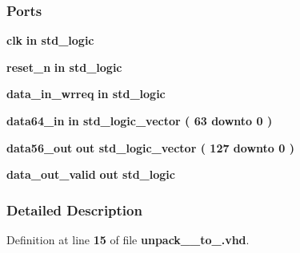 \subsubsection*{Ports}
 \begin{DoxyCompactItemize}
\item 
{\bf clk}  {\bfseries {\bfseries \textcolor{keywordflow}{in}\textcolor{vhdlchar}{ }}} {\bfseries \textcolor{comment}{std\+\_\+logic}\textcolor{vhdlchar}{ }} 
\item 
{\bf reset\+\_\+n}  {\bfseries {\bfseries \textcolor{keywordflow}{in}\textcolor{vhdlchar}{ }}} {\bfseries \textcolor{comment}{std\+\_\+logic}\textcolor{vhdlchar}{ }} 
\item 
{\bf data\+\_\+in\+\_\+wrreq}  {\bfseries {\bfseries \textcolor{keywordflow}{in}\textcolor{vhdlchar}{ }}} {\bfseries \textcolor{comment}{std\+\_\+logic}\textcolor{vhdlchar}{ }} 
\item 
{\bf data64\+\_\+in}  {\bfseries {\bfseries \textcolor{keywordflow}{in}\textcolor{vhdlchar}{ }}} {\bfseries \textcolor{comment}{std\+\_\+logic\+\_\+vector}\textcolor{vhdlchar}{ }\textcolor{vhdlchar}{(}\textcolor{vhdlchar}{ }\textcolor{vhdlchar}{ } \textcolor{vhdldigit}{63} \textcolor{vhdlchar}{ }\textcolor{keywordflow}{downto}\textcolor{vhdlchar}{ }\textcolor{vhdlchar}{ } \textcolor{vhdldigit}{0} \textcolor{vhdlchar}{ }\textcolor{vhdlchar}{)}\textcolor{vhdlchar}{ }} 
\item 
{\bf data56\+\_\+out}  {\bfseries {\bfseries \textcolor{keywordflow}{out}\textcolor{vhdlchar}{ }}} {\bfseries \textcolor{comment}{std\+\_\+logic\+\_\+vector}\textcolor{vhdlchar}{ }\textcolor{vhdlchar}{(}\textcolor{vhdlchar}{ }\textcolor{vhdlchar}{ } \textcolor{vhdldigit}{127} \textcolor{vhdlchar}{ }\textcolor{keywordflow}{downto}\textcolor{vhdlchar}{ }\textcolor{vhdlchar}{ } \textcolor{vhdldigit}{0} \textcolor{vhdlchar}{ }\textcolor{vhdlchar}{)}\textcolor{vhdlchar}{ }} 
\item 
{\bf data\+\_\+out\+\_\+valid}  {\bfseries {\bfseries \textcolor{keywordflow}{out}\textcolor{vhdlchar}{ }}} {\bfseries \textcolor{comment}{std\+\_\+logic}\textcolor{vhdlchar}{ }} 
\end{DoxyCompactItemize}


\subsubsection{Detailed Description}


Definition at line {\bf 15} of file {\bf unpack\+\_\+\_\+to\+\_.\+vhd}.



